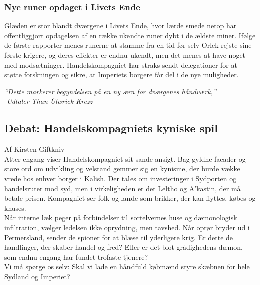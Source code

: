 \documentclass[letterpaper,12pt]{memoir}
\newcommand{\byline}[1]{\textsf{\small\color{Gray} Af #1}}
\newenvironment{pullquote}
  {\begin{tcolorbox}\itshape\large}
  {\end{tcolorbox}}
\begin{document}
\subsubsection*{Nye runer opdaget i Livets Ende}
Glæden er stor blandt dværgene i Livets Ende, hvor lærde smede netop har offentliggjort opdagelsen af en række ukendte runer dybt i de ældste miner. Ifølge de første rapporter menes runerne at stamme fra en tid før selv Orlek rejste sine første krigere, og deres effekter er endnu ukendt, men det menes at have noget med modsætninger. Handelskompagniet har straks sendt delegationer for at støtte forskningen og sikre, at Imperiets borgere får del i de nye muligheder. 

\begin{pullquote}
“Dette markerer begyndelsen på en ny æra for dværgenes håndværk,”\\
\textit{-Udtaler Than Ülwrick Krezz}
\end{pullquote}

\subsection*{Debat: Handelskompagniets kyniske spil}
\byline{Kirsten Giftkniv}\\
Atter engang viser Handelskompagniet sit sande ansigt. Bag gyldne facader og store ord om udvikling og velstand gemmer sig en kynisme, der burde vække vrede hos enhver borger i Kalish. Der tales om investeringer i Sydporten og handelsruter mod syd, men i virkeligheden er det Leltho og A’kastin, der må betale prisen. Kompagniet ser folk og lande som brikker, der kan flyttes, købes og knuses.\\
Når interne læk peger på forbindelser til sortelvernes huse og dæmonologisk infiltration, vælger ledelsen ikke oprydning, men tavshed. Når oprør bryder ud i Permersland, sender de spioner for at blæse til yderligere krig. Er dette de handlinger, der skaber handel og fred? Eller er det blot grådighedens dæmon, som endnu engang har fundet trofaste tjenere?\\
Vi må spørge os selv: Skal vi lade en håndfuld købmænd styre skæbnen for hele Sydland og Imperiet?\\
\end{document}
